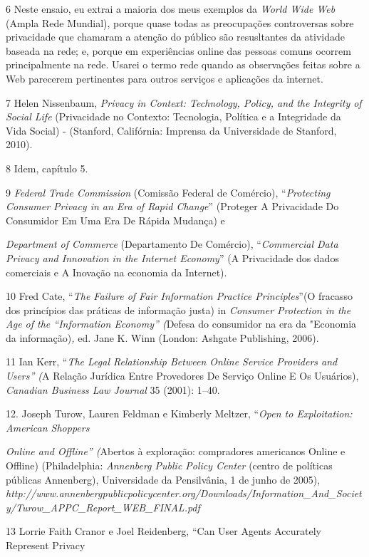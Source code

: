 6 Neste ensaio, eu extrai a maioria dos meus exemplos da \emph{World
Wide Web} (Ampla Rede Mundial), porque quase todas as preocupações
controversas sobre privacidade que chamaram a atenção do público são
resusltantes da atividade baseada na rede; e, porque em experiências
online das pessoas comuns ocorrem principalmente na rede. Usarei o termo
rede quando as observações feitas sobre a Web parecerem pertinentes para
outros serviços e aplicações da internet.

7 Helen Nissenbaum, \emph{Privacy in Context: Technology, Policy, and
the Integrity of Social Life} (Privacidade no Contexto: Tecnologia,
Política e a Integridade da Vida Social) - (Stanford, Califórnia:
Imprensa da Universidade de Stanford, 2010).

8 Idem, capítulo 5.

9 \emph{Federal Trade Commission} (Comissão Federal de Comércio),
``\emph{Protecting Consumer Privacy in an Era of Rapid Change}''
(Proteger A Privacidade Do Consumidor Em Uma Era De Rápida Mudança) e

\emph{Department of Commerce} (Departamento De Comércio),
``\emph{Commercial Data Privacy and Innovation in the Internet
Economy}'' (A Privacidade dos dados comerciais e A Inovação na economia
da Internet).

10 Fred Cate, ``\emph{The Failure of Fair Information Practice
Principles}''(O fracasso dos princípios das práticas de informação
justa) in \emph{Consumer Protection in the Age of the ``Information
Economy'' (}Defesa do consumidor na era da "Economia da
informação)\emph{,} ed. Jane K. Winn (London: Ashgate Publishing, 2006).

11 Ian Kerr, ``\emph{The Legal Relationship Between Online Service
Providers and Users'' (}A Relação Jurídica Entre Provedores De Serviço
Online E Os Usuários), \emph{Canadian Business Law Journal} 35 (2001):
1--40.

12. Joseph Turow, Lauren Feldman e Kimberly Meltzer, ``\emph{Open to
Exploitation: American Shoppers}

\emph{Online and Offline'' (}Abertos à exploração: compradores
americanos Online e Offline) (Philadelphia: \emph{Annenberg Public
Policy Center} (centro de políticas públicas Annenberg), Universidade da
Pensilvânia, 1 de junho de 2005),
\emph{http://www.annenbergpublicpolicycenter.org/Downloads/Information\_And\_Society/Turow\_APPC\_Report\_WEB\_FINAL.pdf}

13 Lorrie Faith Cranor e Joel Reidenberg, ``Can User Agents Accurately
Represent Privacy

